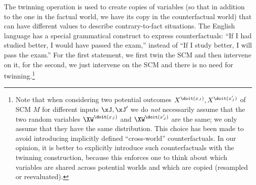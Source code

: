 The twinning operation is used to create copies of variables (so that in addition to the one in the factual world, 
we have its copy in the counterfactual world) that can have different values to describe contrary-to-fact situations.
The English language has a special grammatical construct to express counterfactuals:
``If I had studied better, I would have passed the exam,'' instead of ``If I study better, I will pass the exam.''
For the first statement, we first twin the SCM and then intervene on it, for the second, we just intervene on the SCM and there is no need for twinning.\footnote{Note 
that when considering two potential outcomes $X^{\doit(x_J)},X^{\doit(x_J')}$ of SCM $M$ for different inputs $\xJ, \xJ'$ we do \emph{not} necessarily assume that the two random variables $\XW^{\doit(x_J)}$ and $\XW^{\doit(x_J')}$ are the same; 
we only assume that they have the same distribution. 
This choice has been made to avoid introducing implicitly defined ``cross-world'' counterfactuals.
In our opinion, it is better to explicitly introduce such counterfactuals with the twinning construction, because this enforces one to think about which variables are shared across potential worlds and which are copied (resampled or reevaluated).}

